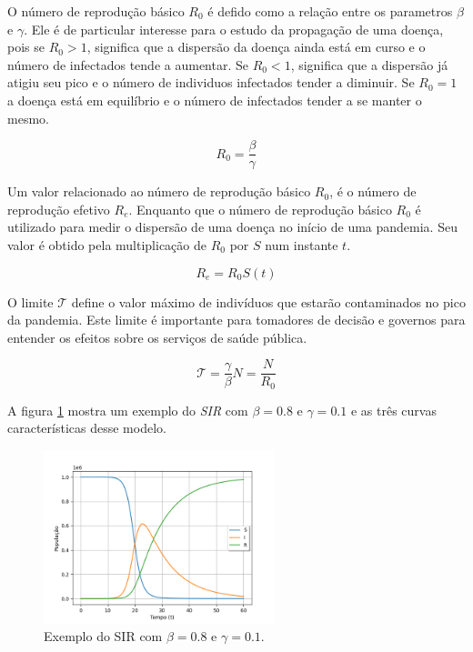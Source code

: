 O número de reprodução básico $R_0$ é defido como a relação entre os parametros
$\beta$ e $\gamma$. Ele é de particular interesse para o estudo da propagação
de uma doença, pois se $R_0 > 1$, significa que a dispersão da doença
ainda está em curso e o número de infectados tende a aumentar. 
Se $R_0 < 1$, significa que a dispersão já atigiu seu pico e o número de individuos
infectados tender a diminuir. Se $R_0 = 1$ a doença está em equilíbrio e o número 
de infectados tender a se manter o mesmo.

\begin{equation}\label{eq:numero-reproducao-basico}
    R_0 = \frac{\beta}{\gamma}
\end{equation}

Um valor relacionado ao número de reprodução básico $R_0$, é o número de reprodução
efetivo $R_e$. Enquanto que o número de reprodução básico $R_0$ é utilizado para
medir o dispersão de uma doença no início de uma pandemia. 
Seu valor é obtido pela multiplicação de $R_0$ por $S$ num instante $t$.

\begin{equation}\label{eq:numero-reproducao-efetivo}
    R_e = R_0 S(t)
\end{equation}

O limite $\mathcal{T}$ define o valor máximo de indivíduos que estarão contaminados
no pico da pandemia. Este limite é importante para tomadores de decisão e governos
para entender os efeitos sobre os serviços de saúde pública.

\begin{equation}
    \mathcal{T} = \frac{\gamma}{\beta}N = \frac{N}{R_0}
\end{equation}

A figura \ref{fig:exemplo-sir} mostra um exemplo do \textit{SIR} com $\beta=0.8$
e $\gamma=0.1$ e as três curvas características desse modelo.

\begin{figure}[htpb]
\centering
\includegraphics[width=0.6\textwidth]{figuras/sir-example-beta0.8-gamma0.1.png}
\caption{Exemplo do SIR com $\beta=0.8$ e $\gamma=0.1$.}
\label{fig:exemplo-sir}
\end{figure}

